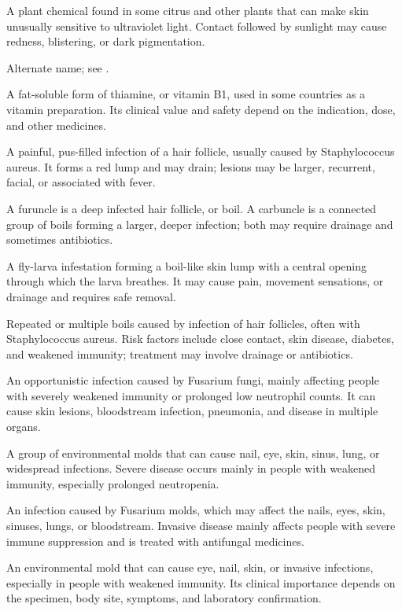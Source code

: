  A plant chemical found in some citrus and other plants that can make skin unusually sensitive to ultraviolet light. Contact followed by sunlight may cause redness, blistering, or dark pigmentation.

 Alternate name; see .

 A fat-soluble form of thiamine, or vitamin B1, used in some countries as a vitamin preparation. Its clinical value and safety depend on the indication, dose, and other medicines.

 A painful, pus-filled infection of a hair follicle, usually caused by Staphylococcus aureus. It forms a red lump and may drain; lesions may be larger, recurrent, facial, or associated with fever.

 A furuncle is a deep infected hair follicle, or boil. A carbuncle is a connected group of boils forming a larger, deeper infection; both may require drainage and sometimes antibiotics.

 A fly-larva infestation forming a boil-like skin lump with a central opening through which the larva breathes. It may cause pain, movement sensations, or drainage and requires safe removal.

 Repeated or multiple boils caused by infection of hair follicles, often with Staphylococcus aureus. Risk factors include close contact, skin disease, diabetes, and weakened immunity; treatment may involve drainage or antibiotics.

 An opportunistic infection caused by Fusarium fungi, mainly affecting people with severely weakened immunity or prolonged low neutrophil counts. It can cause skin lesions, bloodstream infection, pneumonia, and disease in multiple organs.

 A group of environmental molds that can cause nail, eye, skin, sinus, lung, or widespread infections. Severe disease occurs mainly in people with weakened immunity, especially prolonged neutropenia.

 An infection caused by Fusarium molds, which may affect the nails, eyes, skin, sinuses, lungs, or bloodstream. Invasive disease mainly affects people with severe immune suppression and is treated with antifungal medicines.

 An environmental mold that can cause eye, nail, skin, or invasive infections, especially in people with weakened immunity. Its clinical importance depends on the specimen, body site, symptoms, and laboratory confirmation.

